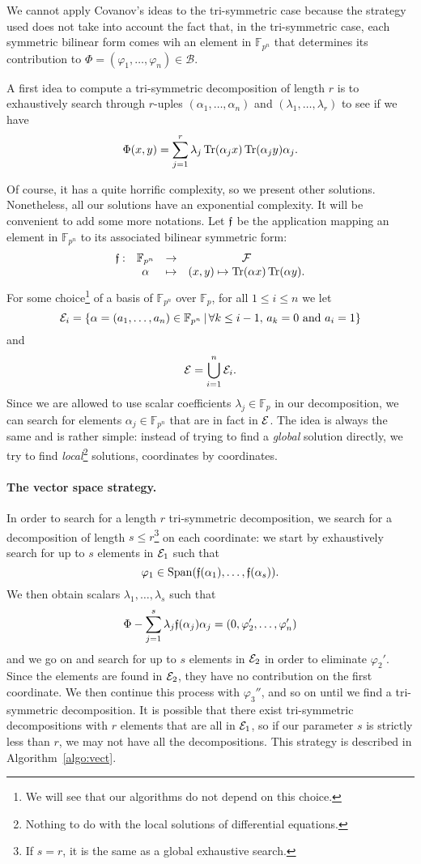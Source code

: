 \documentclass[a4paper,11pt]{article}
\begin{document}
We cannot apply Covanov's ideas to the tri-symmetric case because the strategy
used does not take into account the fact that, in the tri-symmetric case, each
symmetric bilinear form comes wih an element in $\mathbb{F}_{p^n}$ that
determines its
contribution to $\Phi=(\varphi_1, \dots, \varphi_n)\in\mathcal B$. 

A first idea to compute a tri-symmetric decomposition of length $r$ is to
exhaustively search through $r$-uples $(\alpha_1, \dots, \alpha_n)$ and
$(\lambda_1, \dots, \lambda_r)$ to see if we have
\[
  \Phi(x, y) = \sum_{j=1}^r \lambda_j\operatorname{Tr}(\alpha_j x)\operatorname{Tr}(\alpha_j y)\alpha_j.
\]

Of course, it has a quite horrific complexity, so we present other solutions.
Nonetheless, all our solutions have an exponential complexity. 
It will be convenient to add some more notations.
Let $\mathfrak{f}$ be the application mapping an element in
$\mathbb{F}_{p^n}$ to its associated bilinear symmetric form:
\[
\begin{array}{cccc}
  \mathfrak{f}: & \mathbb{F}_{p^n} & \to & \mathcal F \\
  & \alpha & \mapsto & (x, y)\mapsto \operatorname{Tr}(\alpha x)\operatorname{Tr}(\alpha y).
\end{array}
\]
For some choice\footnote{We will see that our algorithms do not depend on this
choice.} of a basis of $\mathbb{F}_{p^n}$ over $\mathbb{F}_p$, for all
$1\leq i\leq n$ we let
\[
  \mathcal{E}_i=\left\{ \alpha=(a_1, \dots, a_n)\in\mathbb{F}_{p^n}
  \,|\, \forall k\leq i-1,\,a_k=0\text{ and }a_i=1 \right\}
\]
and
\[
  \mathcal{E} = \bigcup_{i=1}^n\mathcal{E}_i.
\]
Since we are allowed to use scalar coefficients $\lambda_j\in\mathbb{F}_p$ in our decomposition,
we can search for elements $\alpha_j\in\mathbb{F}_{p^n}$ that are in fact in
$\mathcal{E}$. The idea is always the same and is rather simple: instead of trying to find a
\emph{global} solution directly, we try to find \emph{local}\footnote{Nothing to
do with the local solutions of differential equations.} solutions, \ie coordinates by
coordinates.

\paragraph{The vector space strategy.}
In order to search for a length $r$ tri-symmetric decomposition, we
search for a decomposition of length $s\leq r$\footnote{If $s=r$, it is the same
as a global exhaustive search.} on each coordinate: we start by exhaustively
search for up to $s$ elements in $\mathcal{E}_1$ such that
\[
  \varphi_1\in\operatorname{Span}(\mathfrak{f}(\alpha_1), \dots, \mathfrak{f}(\alpha_s)).
\]
We then obtain scalars $\lambda_1, \dots, \lambda_s$ such that
\[
  \Phi-\sum_{j=1}^s\lambda_j\mathfrak{f}(\alpha_j)\alpha_j=(0, \varphi_2', \dots,
  \varphi_n')
\]
and we go on and search for up to $s$ elements in $\mathcal{E}_2$ in order to eliminate
$\varphi_2'$. Since the elements are
found in $\mathcal{E}_2$, they have no contribution on the first coordinate. We then
continue this process with $\varphi_3''$, and so on until we find a
tri-symmetric decomposition. It is
possible that there exist tri-symmetric decompositions with $r$ elements that
are all in $\mathcal{E}_1$, so if our parameter $s$ is strictly less than $r$, we may not
have all the decompositions. This strategy is described in
Algorithm~\ref{algo:vect}.
\end{document}
